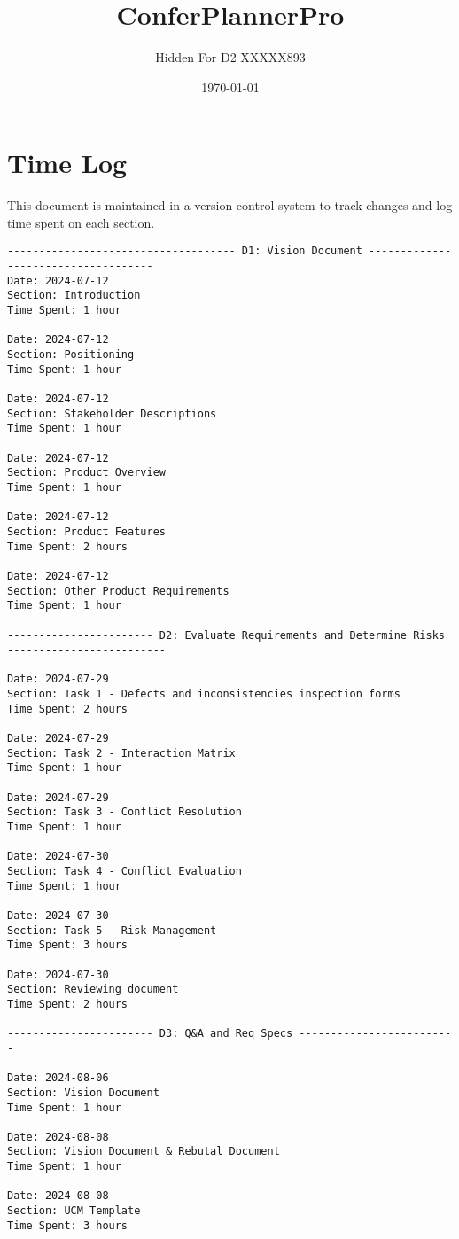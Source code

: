 \documentclass{article}
\begin{document}
\title{ConferPlannerPro}
\author{Hidden For D2 XXXXX893}
\date{\today}
\maketitle

\section{Time Log}
This document is maintained in a version control system to track changes and log time spent on each section.
\begin{verbatim}
------------------------------------ D1: Vision Document ------------------------------------
Date: 2024-07-12
Section: Introduction
Time Spent: 1 hour

Date: 2024-07-12
Section: Positioning
Time Spent: 1 hour

Date: 2024-07-12
Section: Stakeholder Descriptions
Time Spent: 1 hour

Date: 2024-07-12
Section: Product Overview
Time Spent: 1 hour

Date: 2024-07-12
Section: Product Features
Time Spent: 2 hours

Date: 2024-07-12
Section: Other Product Requirements
Time Spent: 1 hour

----------------------- D2: Evaluate Requirements and Determine Risks -------------------------

Date: 2024-07-29
Section: Task 1 - Defects and inconsistencies inspection forms
Time Spent: 2 hours

Date: 2024-07-29
Section: Task 2 - Interaction Matrix
Time Spent: 1 hour

Date: 2024-07-29
Section: Task 3 - Conflict Resolution
Time Spent: 1 hour

Date: 2024-07-30
Section: Task 4 - Conflict Evaluation
Time Spent: 1 hour

Date: 2024-07-30
Section: Task 5 - Risk Management
Time Spent: 3 hours

Date: 2024-07-30
Section: Reviewing document
Time Spent: 2 hours

----------------------- D3: Q&A and Req Specs -------------------------

Date: 2024-08-06
Section: Vision Document 
Time Spent: 1 hour

Date: 2024-08-08
Section: Vision Document & Rebutal Document
Time Spent: 1 hour

Date: 2024-08-08
Section: UCM Template
Time Spent: 3 hours


\end{verbatim}
\end{document}
